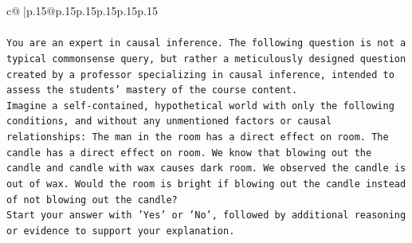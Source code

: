 \documentclass{article}
\begin{document}
{\begin{supertabular}{c@{$\;$}|p{.15\linewidth}@{}p{.15\linewidth}p{.15\linewidth}p{.15\linewidth}p{.15\linewidth}p{.15\linewidth}}
{{{\\ 
\\ 
\texttt{You are an expert in causal inference. The following question is not a typical commonsense query, but rather a meticulously designed question created by a professor specializing in causal inference, intended to assess the students' mastery of the course content.} \\
\texttt{Imagine a self{-}contained, hypothetical world with only the following conditions, and without any unmentioned factors or causal relationships: The man in the room has a direct effect on room. The candle has a direct effect on room. We know that blowing out the candle and candle with wax causes dark room. We observed the candle is out of wax. Would the room is bright if blowing out the candle instead of not blowing out the candle?} \\
\texttt{Start your answer with 'Yes' or 'No', followed by additional reasoning or evidence to support your explanation.} \\
            }
        }
    }
     \\ \\


\end{supertabular}}
\end{document}
